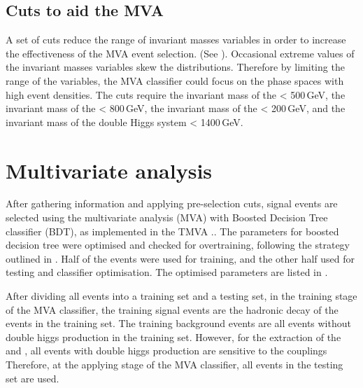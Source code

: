 \subsection{Cuts to aid the MVA}

A set of cuts reduce the range of invariant masses variables in order to increase the effectiveness of the MVA event selection. (See ). Occasional extreme values of the invariant masses variables skew the distributions. Therefore by limiting the range of the variables, the MVA classifier could focus on the phase spaces with high event densities. The cuts require the invariant mass of the \Hbb < 500\,GeV, the invariant mass of the \HWW < 800\,GeV, the invariant mass of the \PW < 200\,GeV, and the invariant mass of the double Higgs system < 1400\,GeV.



\section{Multivariate analysis}
\label{sec:doubleHiggsMVA}
After gathering information and applying  pre-selection cuts, signal events are selected using the multivariate analysis (MVA) with Boosted Decision Tree classifier (BDT), as implemented in the TMVA \cite{Hocker:2007ht}.. The parameters for boosted decision tree were optimised and checked for overtraining, following the strategy outlined in . Half of the events were used for training, and the other half used for testing and classifier optimisation. The optimised parameters are listed in .

After dividing all events into a training set and a testing set, in the training stage of the MVA classifier, the training signal events are the  hadronic \WW decay of the \eeToHHbbWW events in the training set. The training background events are all events without double higgs production  in the training set. However, for the extraction of the \gHHH and \gWWHH,  all events with double higgs production are sensitive to the couplings Therefore, at the applying stage of the MVA classifier, all events in the testing set are used.



